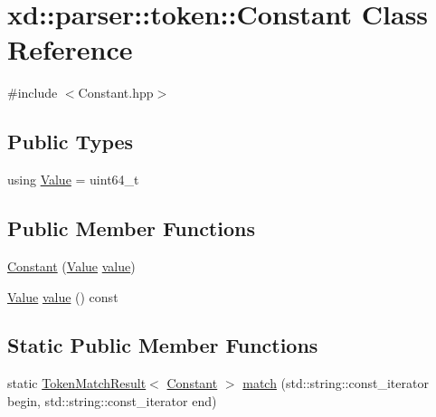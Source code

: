 \hypertarget{classxd_1_1parser_1_1token_1_1_constant}{}\section{xd\+:\+:parser\+:\+:token\+:\+:Constant Class Reference}
\label{classxd_1_1parser_1_1token_1_1_constant}


{\ttfamily \#include $<$Constant.\+hpp$>$}

\subsection*{Public Types}
\begin{DoxyCompactItemize}
\item 
using \mbox{\hyperlink{classxd_1_1parser_1_1token_1_1_constant_a7ed9a004309ac798a76a11f67552616b}{Value}} = uint64\+\_\+t
\end{DoxyCompactItemize}
\subsection*{Public Member Functions}
\begin{DoxyCompactItemize}
\item 
\mbox{\hyperlink{classxd_1_1parser_1_1token_1_1_constant_a4281cf58b6e9f375b25d93ef48c9c59e}{Constant}} (\mbox{\hyperlink{classxd_1_1parser_1_1token_1_1_constant_a7ed9a004309ac798a76a11f67552616b}{Value}} \mbox{\hyperlink{classxd_1_1parser_1_1token_1_1_constant_a09c7aa56d150130f89605eb95fa0057c}{value}})
\item 
\mbox{\hyperlink{classxd_1_1parser_1_1token_1_1_constant_a7ed9a004309ac798a76a11f67552616b}{Value}} \mbox{\hyperlink{classxd_1_1parser_1_1token_1_1_constant_a09c7aa56d150130f89605eb95fa0057c}{value}} () const
\end{DoxyCompactItemize}
\subsection*{Static Public Member Functions}
\begin{DoxyCompactItemize}
\item 
static \mbox{\hyperlink{namespacexd_1_1parser_1_1token_a766c52bbfb7cb1f08498ef0bb9ec756e}{Token\+Match\+Result}}$<$ \mbox{\hyperlink{classxd_1_1parser_1_1token_1_1_constant}{Constant}} $>$ \mbox{\hyperlink{classxd_1_1parser_1_1token_1_1_constant_a02e8edf895c8dfaba56c13578ffe74ed}{match}} (std\+::string\+::const\+\_\+iterator begin, std\+::string\+::const\+\_\+iterator end)
\end{DoxyCompactItemize}


